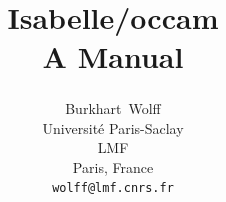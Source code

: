 \documentclass[abstract=on,fontsize=10pt,a4paper,mpinclude=true,
oneside,
pagesize,DIV=14]{scrartcl}
\title{Isabelle/occam\\[.3em]\large A Manual}
\author{
Burkhart~Wolff\textsuperscript{\orcidlink{0000-0002-9648-7663}}\\\small
Universit\'e Paris-Saclay\\
LMF\\
Paris, France\\
\texttt{wolff@lmf.cnrs.fr}
}
\date{}
\begin{document}
\renewcommand{\sectionautorefname}{Section}
\renewcommand{\subsectionautorefname}{Section}
\renewcommand{\subsubsectionautorefname}{Section}

\maketitle



\printbibliography
\end{document}
